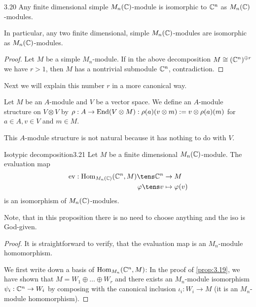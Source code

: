 \documentclass[twoside = false,	%
		headsepline,		%
		parskip = true,
		]{scrbook}						%
\begin{document}
    \begin{corollary}{}{3.20}
        Any finite dimensional simple $M_n(\mathbb C)$-module is isomorphic to $\mathbb C^n$ as $M_n(\mathbb C)$-modules.
    \end{corollary}
    
    In particular, any two finite dimensional, simple $M_n(\mathbb C)$-modules are isomorphic as $M_n(\mathbb C)$-modules.
    
    \begin{proof}
        Let $M$ be a simple $M_n$-module. If in the above decomposition $M\cong(\mathbb C^n)^{\oplus r}$ we have $r>1$, then $M$ has a nontrivial submodule $\mathbb C^n$, contradiction.
    \end{proof}
    
    Next we will explain this number $r$ in a more canonical way.

    Let $M$ be an $A$-module and $V$ be a vector space. We define an $A$-module structure on $V\otimes V$ by $\rho: A \to \mathrm{End}(V\otimes M): \rho(a)(v\otimes m):= v \otimes \rho(a)(m)$ for $a\in A, v\in V$ and $m\in M$.

    This $A$-module structure is not natural because it has nothing to do with $V$.
    \begin{proposition}{Isotypic decomposition}{3.21}
        Let $M$ be a finite dimensional $M_n(\mathbb C)$-module. The evaluation map
        \begin{equation*}
        \begin{split}
            \ev: \Hom_{M_n(\C)}(\C^n,M) \tens \C^n &\to M \\
            \varphi \tens v &\mapsto \varphi(v)
        \end{split}
        \end{equation*}
        is an isomorphism of $M_n(\mathbb C)$-modules.
    \end{proposition}

    Note, that in this proposition there is no need to choose anything and the iso is God-given.

    \begin{proof}
        It is straightforward to verify, that the evaluation map is an $M_n$-module homomorphism.

    We first write down a basis of $\mathrm{Hom}_{M_n}(\mathbb C^n,M)$: In the proof of \ref{prop:3.19}, we have shown that $M= W_1 \oplus \dots \oplus W_r$ and there exists an $M_n$-module isomorphism $\psi_i: \mathbb C^n\to W_i$ by composing with the canonical inclusion $\iota_i: W_i \to M$ (it is an $M_n$-module homomorphism).
    \end{proof}
    
\end{document}
